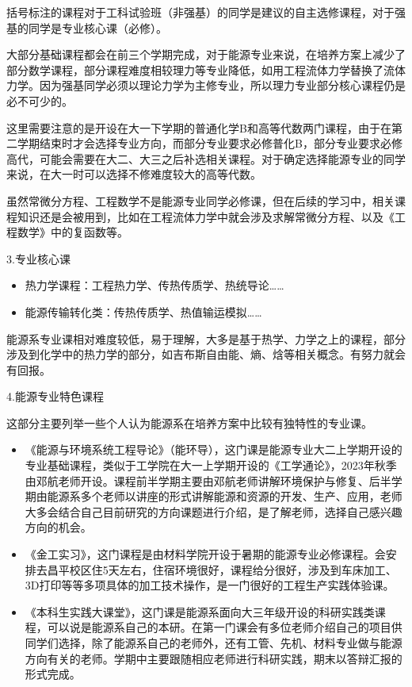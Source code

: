 \documentclass[11pt,oneside]{book}
\begin{document}
括号标注的课程对于工科试验班（非强基）的同学是建议的自主选修课程，对于强基的同学是专业核心课（必修）。

大部分基础课程都会在前三个学期完成，对于能源专业来说，在培养方案上减少了部分数学课程，部分课程难度相较理力等专业降低，如用工程流体力学替换了流体力学。因为强基同学必须以理论力学为主修专业，所以理力专业部分核心课程仍是必不可少的。

这里需要注意的是开设在大一下学期的普通化学B和高等代数两门课程，由于在第二学期结束时才会选择专业方向，而部分专业要求必修普化B，部分专业要求必修高代，可能会需要在大二、大三之后补选相关课程。对于确定选择能源专业的同学来说，在大一时可以选择不修难度较大的高等代数。

虽然常微分方程、工程数学不是能源专业同学必修课，但在后续的学习中，相关课程知识还是会被用到，比如在工程流体力学中就会涉及求解常微分方程、以及《工程数学》中的复函数等。

3.专业核心课
\begin{itemize}
    \item 热力学课程：工程热力学、传热传质学、热统导论……

    \item 能源传输转化类：传热传质学、热值输运模拟……

\end{itemize}


能源系专业课相对难度较低，易于理解，大多是基于热学、力学之上的课程，部分涉及到化学中的热力学的部分，如吉布斯自由能、熵、焓等相关概念。有努力就会有回报。

4.能源专业特色课程

这部分主要列举一些个人认为能源系在培养方案中比较有独特性的专业课。

\begin{itemize}
    \item 《能源与环境系统工程导论》（能环导），这门课是能源专业大二上学期开设的专业基础课程，类似于工学院在大一上学期开设的《工学通论》，2023年秋季由邓航老师开设。课程前半学期主要由邓航老师讲解环境保护与修复、后半学期由能源系多个老师以讲座的形式讲解能源和资源的开发、生产、应用，老师大多会结合自己目前研究的方向课题进行介绍，是了解老师，选择自己感兴趣方向的机会。

    \item 《金工实习》，这门课程是由材料学院开设于暑期的能源专业必修课程。会安排去昌平校区住5天左右，住宿环境很好，课程给分很好，涉及到车床加工、3D打印等等多项具体的加工技术操作，是一门很好的工程生产实践体验课。

    \item 《本科生实践大课堂》，这门课是能源系面向大三年级开设的科研实践类课程，可以说是能源系自己的本研。在第一门课会有多位老师介绍自己的项目供同学们选择，除了能源系自己的老师外，还有工管、先机、材料专业做与能源方向有关的老师。学期中主要跟随相应老师进行科研实践，期末以答辩汇报的形式完成。

\end{itemize}
\end{document}
